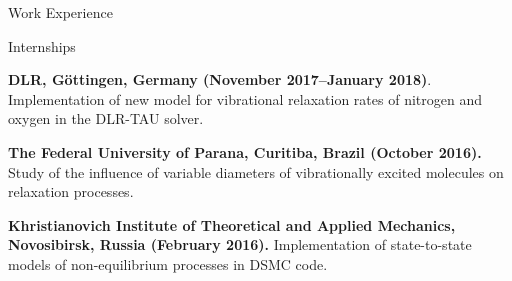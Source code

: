 \documentclass{resume} %
\begin{document}
\begin{rSection}{Work Experience}


\begin{rSubsection}{Internships}{}{}{}
\item \textbf{DLR, G\"{o}ttingen, Germany (November 2017--January 2018)}.
Implementation of new model for vibrational relaxation rates of nitrogen and oxygen in the DLR-TAU solver.

\item \textbf{The Federal University of Parana, Curitiba, Brazil (October 2016).}
Study of the influence of variable diameters of vibrationally excited molecules on relaxation processes.

\item \textbf{Khristianovich Institute of Theoretical and Applied Mechanics, Novosibirsk, Russia (February 2016).}
Implementation of state-to-state models of non-equilibrium processes in DSMC code.
\end{rSubsection}
\end{rSection}

\end{document}
